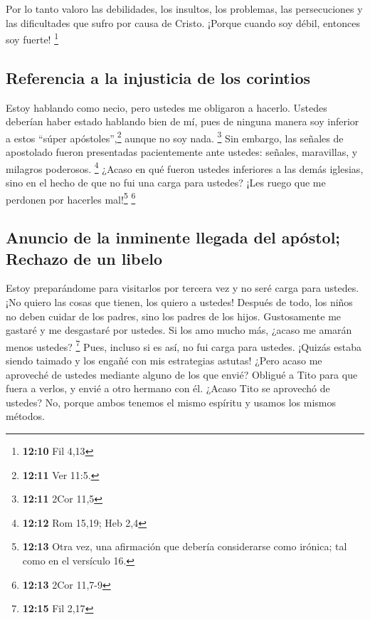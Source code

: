  Por lo tanto valoro las debilidades, los insultos, los
problemas, las persecuciones y las dificultades que sufro por causa de
Cristo. ¡Porque cuando soy débil, entonces soy fuerte! \footnote{\textbf{12:10}
  Fil 4,13}

\hypertarget{referencia-a-la-injusticia-de-los-corintios}{%
\subsection{Referencia a la injusticia de los
corintios}\label{referencia-a-la-injusticia-de-los-corintios}}

 Estoy hablando como necio, pero ustedes me obligaron a
hacerlo. Ustedes deberían haber estado hablando bien de mí, pues de
ninguna manera soy inferior a estos ``súper apóstoles'',\footnote{\textbf{12:11}
  Ver 11:5.} aunque no soy nada. \footnote{\textbf{12:11} 2Cor 11,5}
 Sin embargo, las señales de apostolado fueron
presentadas pacientemente ante ustedes: señales, maravillas, y milagros
poderosos. \footnote{\textbf{12:12} Rom 15,19; Heb 2,4} 
¿Acaso en qué fueron ustedes inferiores a las demás iglesias, sino en el
hecho de que no fui una carga para ustedes? ¡Les ruego que me perdonen
por hacerles mal!\footnote{\textbf{12:13} Otra vez, una afirmación que
  debería considerarse como irónica; tal como en el versículo 16.}
\footnote{\textbf{12:13} 2Cor 11,7-9}

\hypertarget{anuncio-de-la-inminente-llegada-del-apuxf3stol-rechazo-de-un-libelo}{%
\subsection{Anuncio de la inminente llegada del apóstol; Rechazo de un
libelo}\label{anuncio-de-la-inminente-llegada-del-apuxf3stol-rechazo-de-un-libelo}}

 Estoy preparándome para visitarlos por tercera vez y no
seré carga para ustedes. ¡No quiero las cosas que tienen, los quiero a
ustedes! Después de todo, los niños no deben cuidar de los padres, sino
los padres de los hijos.  Gustosamente me gastaré y me
desgastaré por ustedes. Si los amo mucho más, ¿acaso me amarán menos
ustedes? \footnote{\textbf{12:15} Fil 2,17}  Pues,
incluso si es así, no fui carga para ustedes. ¡Quizás estaba siendo
taimado y los engañé con mis estrategias astutas!  ¿Pero
acaso me aproveché de ustedes mediante alguno de los que envié?
 Obligué a Tito para que fuera a verlos, y envié a otro
hermano con él. ¿Acaso Tito se aprovechó de ustedes? No, porque ambos
tenemos el mismo espíritu y usamos los mismos métodos.

